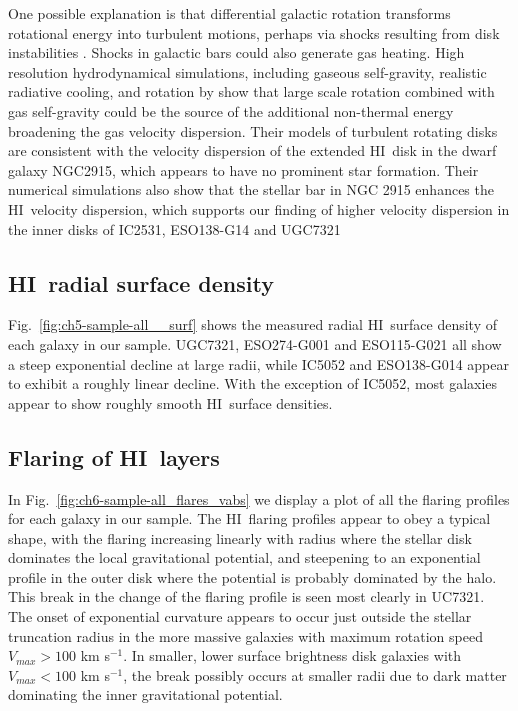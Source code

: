 \documentclass[traditabstract]{aa} %
\newcommand\HI{H{\small I}}
\newcommand\kms{km s$^{-1}$}
\begin{document}
One possible explanation is that differential galactic rotation
transforms rotational energy into turbulent motions, perhaps via
shocks resulting from disk instabilities
\citep{quiroga1983,rk1987,sb1999}. Shocks in galactic bars
could also generate  gas heating. High resolution
hydrodynamical simulations, including gaseous self-gravity, realistic
radiative cooling, and rotation by \citet{wmn2002} show that large
scale rotation combined with gas self-gravity could be the source of
the additional non-thermal energy broadening the gas velocity
dispersion.  Their models of turbulent rotating disks are consistent
with the velocity dispersion of the extended \HI\ disk in the dwarf galaxy
NGC2915, which appears to have no prominent star formation. Their
numerical simulations also show that the stellar bar in NGC 2915
enhances the \HI\ velocity dispersion, which supports our finding of
higher velocity dispersion in the inner disks of IC2531, ESO138-G14
and UGC7321

\subsection{\HI\ radial surface density}

Fig.~\ref{fig:ch5-sample-all__surf} shows the measured
radial \HI\ surface density of each galaxy in our sample. UGC7321,
ESO274-G001 and ESO115-G021 all show a steep exponential decline at
large radii, while IC5052 and ESO138-G014 appear to exhibit a roughly
linear decline. With the exception of IC5052, most galaxies appear to
show roughly smooth \HI\ surface densities.



\subsection{Flaring of \HI\ layers}
\label{sec:ch6-disc}


In Fig.~\ref{fig:ch6-sample-all_flares_vabs} we display a plot of
all the flaring profiles for each galaxy in our sample. The \HI\
flaring profiles appear to obey a typical shape, with the flaring
increasing linearly with radius where the stellar disk dominates the
local gravitational potential, and steepening to an exponential
profile in the outer disk where the potential is probably dominated by
the halo. This break in the change of the flaring profile is seen most clearly in UC7321. 
The onset of exponential curvature appears to occur just
outside the stellar truncation radius in the more massive galaxies with
maximum rotation speed $V_{max} > 100$ \kms. In smaller, lower surface 
brightness disk galaxies with $V_{max} < 100$ \kms, the break possibly occurs 
at smaller radii due to dark matter dominating the inner gravitational potential.
\end{document}
